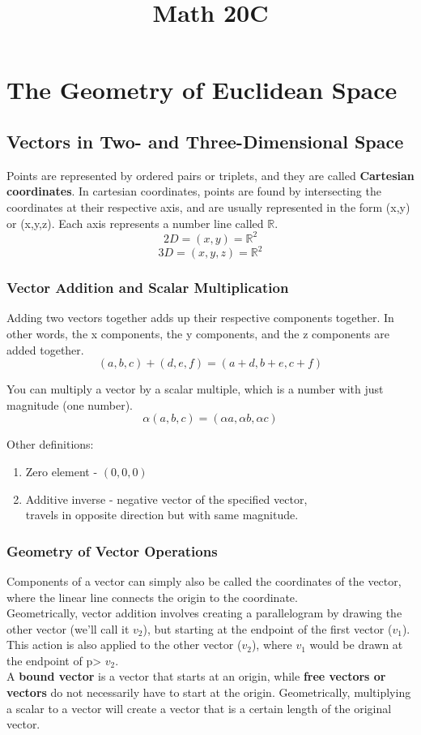 \documentclass{article}
\title{Math 20C}
\author{}
\begin{document}
\maketitle

\section{The Geometry of Euclidean Space}

\subsection{Vectors in Two- and Three-Dimensional Space}

Points are represented by ordered pairs or triplets, and they are called
\textbf{Cartesian coordinates}. In cartesian coordinates, points are found by
intersecting the coordinates at their respective axis, and are usually represented in the form (x,y) or (x,y,z). Each axis represents a number line called $\mathbb{R}$.
$$2D =(x,y)= \mathbb{R}^2$$
$$3D =(x,y,z)= \mathbb{R}^2$$

\subsubsection{Vector Addition and Scalar Multiplication}
Adding two vectors together adds up their respective components together.
In other words, the x components, the y components, and the z components are added together.
$$ (a,b,c) + (d,e,f) = (a+d, b+e, c+f)$$

You can multiply a vector by a scalar multiple, which is a number with just magnitude (one number).
$$ \alpha(a,b,c) = (\alpha a,\alpha b, \alpha c) $$

Other definitions:
\begin{enumerate}
  \item Zero element - $(0,0,0)$
  \item Additive inverse - negative vector of the specified vector, \\
	  travels in opposite direction but with same magnitude.
\end{enumerate}

\subsubsection{Geometry of Vector Operations}
Components of a vector can simply also be called the coordinates of the vector,
where the linear line connects the origin to the coordinate. \\
Geometrically, vector addition involves creating a parallelogram by drawing
the other vector (we'll call it $v_2$), but starting at the endpoint of the first vector ($v_1$).
This action is also applied to the other vector ($v_2$), where $v_1$ would be drawn at the endpoint of 
p> 
$v_2$. \\
A \textbf{bound vector} is a vector that starts at an origin, while \textbf{free vectors or vectors} 
do not necessarily have to start at the origin.
Geometrically, multiplying a scalar to a vector will create a vector that is a certain length of the original vector.
\end{document}
